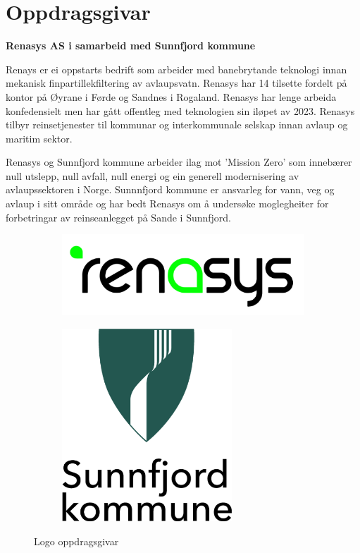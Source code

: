 \section{Oppdragsgivar}
\textbf{Renasys AS i samarbeid med Sunnfjord kommune}

Renays\citep{Renasys} er ei oppstarts bedrift som arbeider med banebrytande teknologi innan mekanisk finpartillekfiltering av avlaupsvatn.
Renasys har 14 tilsette fordelt på kontor på Øyrane i Førde og Sandnes i Rogaland. 
Renasys har lenge arbeida konfedensielt men har gått offentleg med teknologien sin iløpet av 2023. 
Renasys tilbyr reinsetjenester til kommunar og interkommunale selskap innan avlaup og maritim sektor.

Renasys og Sunnfjord kommune\citep{SunnfjordKommune} arbeider ilag mot 'Mission Zero' som innebærer 
null utslepp, null avfall, null energi og ein generell modernisering av avlaupssektoren i Norge.
Sunnnfjord kommune er ansvarleg for vann, veg og avlaup i sitt område og har bedt 
Renasys om å undersøke moglegheiter for forbetringar av reinseanlegget på Sande i Sunnfjord.
\newline
\newline

\begin{figure}[htbp]
    \centering
    \begin{subfigure}[b]{0.3\textwidth}
        \centering
        \includegraphics[width=1\textwidth]{Bilder/renasys.png}
    \end{subfigure}
    \hfill
    \begin{subfigure}[b]{0.3\textwidth}
        \centering
        \includegraphics[width=0.7\textwidth]{Bilder/SK.png}
    \end{subfigure}
    \caption{Logo oppdragsgivar}\label{fig:Oppdragsgivar}
\end{figure}